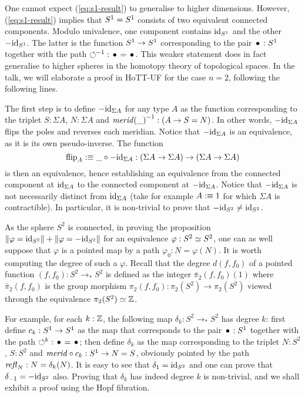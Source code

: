 \documentclass{easychair}
\newcommand{\Sp}{{S^2}}%
\newcommand{\mrd}{\mathit{merid}}%
\newcommand{\susp}[1]{\Sigma{#1}}%
\newcommand{\ptdto}{\to_\ast}%
\newcommand{\flip}{\operatorname{flip}}%
\def\blank{\_}%
\begin{document}
One cannot expect (\ref{eq:s1-result}) to generalise to higher
dimensions. However, (\ref{eq:s1-result}) implies that ${S^1} = {S^1}$
consists of two equivalent connected components. Modulo univalence,
one component contains $\mathord{\mathrm{id}}_{S^1}$ and the other $-\mathord{\mathrm{id}}_{S^1}$. The latter
is the function ${S^1} \to {S^1}$ corresponding to the pair $\base:\Sc$
together with the path $\inv\Sloop:\base=\base$. This weaker statement
does in fact generalise to higher spheres in the homotopy theory of
topological spaces. In the talk, we will elaborate a proof in HoTT-UF
for the case $n=2$, following the following lines.

The first step is to define $-\id_{\susp A}$ for any type $A$ as the
function corresponding to the triplet $S:\susp A$, $N:\susp A$ and
$\inv{\mrd(\blank)} : (A \to S=N)$. In other words, $-\id_{\susp A}$
flips the poles and reverses each meridian. Notice that
$-\id_{\susp A}$ is an equivalence, as it is its own
pseudo-inverse. The function
\begin{displaymath}
  \flip_A \defequi \blank \circ -\id_{\susp A} : (\susp A \to \susp A) \to (\susp A \to \susp A)
\end{displaymath}
is then an equivalence, hence establishing an equivalence from the
connected component at $\id_{\susp A}$ to the connected component at
$-\id_{\susp A}$. Notice that $-\id_{\susp A}$ is not necessarily
distinct from $\id_{\susp A}$ (take for example $A\mathrel{\hbox{:}\mkern-5mu\equiv} 1$ for
which $\susp A$ is contractible). In particular, it is non-trivial to
prove that $-\id_{\Sp} \neq \id_{\Sp}$.

As the sphere $\Sp$ is connected, in proving the proposition
$\Trunc{\varphi=\id_\Sp}+\Trunc{\varphi=-\id_\Sp}$ for an equivalence
$\varphi:\Sp \weq \Sp$, one can as well suppose that $\varphi$ is a
pointed map by a path $\varphi_0:N=\varphi(N)$. It is worth computing
the degree of such a $\varphi$. Recall that the degree $d(f,f_0)$ of a
pointed function $(f,f_0):\Sp \ptdto\Sp$ is defined as the integer
$\bar \pi_2(f,f_0)(1)$ where $\bar\pi_2(f,f_0)$ is the group morphism
$\pi_2(f,f_0) : \pi_2(\Sp) \to \pi_2(\Sp)$ viewed through the
equivalence $\pi_2(\Sp) \weq \ZZ$.

For example, for each $k:\mathbb{Z}$, the following map
$\delta_k : \Sp \ptdto \Sp$ has degree $k$: first define
$c_k:{S^1}\to{S^1}$ as the map that corresponds to the pair $\base:\Sc$
together with the path $\Sloop^k:\base=\base$; then define $\delta_k$
as the map corresponding to the triplet $N:\Sp$, $S:\Sp$ and
$\mrd{}\circ c_k: \Sc \to N=S$, obviously pointed by the path
$\mathop{{\mathit{refl}}_{N}}:N=\delta_k(N)$.  It is easy to see that
$\delta_1 = \id_{\Sp}$ and one can prove that
$\delta_{-1} = -\id_{\Sp}$ also.  Proving that $\delta_k$ has indeed
degree $k$ is non-trivial, and we shall exhibit a proof using the Hopf
fibration.
\end{document}

